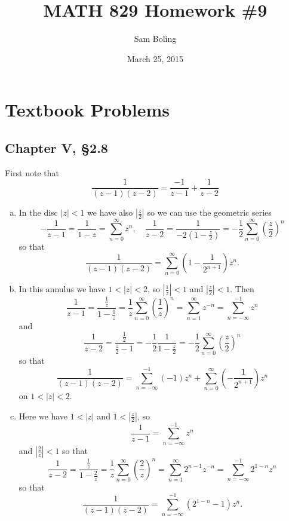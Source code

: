 \documentclass{article}
\title{MATH 829 Homework \#9}
\date{March 25, 2015}
\author{Sam Boling}
\newcounter{Problem}
\begin{document}
\begin{titlepage}
\maketitle
\end{titlepage}

\section{Textbook Problems}
\subsection{Chapter V, \S 2.8}
First note that
$$
  \frac{1}{(z - 1)(z-2)} 
= \frac{-1}{z - 1}
+ \frac{1}{z - 2}
$$
\begin{enumerate}[(a)]
  \item{
    In the disc $|z| < 1$ we have also $\left|\frac{z}{2}\right|$ so we can
    use the geometric series
    $$
      -\frac{1}{z - 1} 
    =  \frac{1}{1 - z} 
    =  \sum_{n=0}^\infty z^n, \quad
      \frac{1}{z - 2} 
    = \frac{1}{-2(1 - \frac{z}{2})} 
    = -\frac{1}{2}
       \sum_{n=0}^\infty 
         \left(\frac{z}{2}\right)^n
    $$
    so that
    $$
      \frac{1}{(z-1)(z-2)}
    = \sum_{n=0}^\infty 
        \left(
          1 - \frac{1}{2^{n+1}}
        \right)
        z^n.
    $$
  }
  \item{
    In this annulus we have $1 < |z| < 2$, so 
    $\left|\frac{1}{z}\right| < 1$ and 
    $\left|\frac{z}{2}\right| < 1$. Then
    $$
      \frac{1}{z - 1} 
    = \frac{\frac{1}{z}}
           {1 - \frac{1}{z}}
    = \frac{1}{z}
      \sum_{n=0}^\infty 
        \left(\frac{1}{z}\right)^n
    = \sum_{n=1}^\infty z^{-n}
    = \sum_{n=-\infty}^{-1} z^n
    $$
    and
    $$
      \frac{1}{z - 2}
    = \frac{\frac{1}{2}}
           {\frac{z}{2} - 1}
    = -\frac{1}{2}
       \frac{1}{1 - \frac{z}{2}}
    = -\frac{1}{2}
       \sum_{n=0}^\infty
         \left(\frac{z}{2}\right)^n
    $$
    so that
    $$
      \frac{1}{(z-1)(z-2)}
    = \sum_{n=-\infty}^{-1} (-1) z^n
    + \sum_{n=0}^\infty \left(-\frac{1}{2^{n+1}}\right) z^n
    $$
    on $1 < |z| < 2$.
  }
  \item{
    Here we have $1 < |z|$ and $1 < \left|\frac{z}{2}\right|$, so
    $$
      \frac{1}{z - 1} 
    = \sum_{n=-\infty}^{-1} 
        z^{n}
    $$
    and $\left|\frac{2}{z}\right| < 1$ so that
    $$
      \frac{1}{z - 2}
    = \frac{\frac{1}{z}}{1 - \frac{2}{z}}
    = \frac{1}{z}
      \sum_{n=0}^\infty
        \left(\frac{2}{z}\right)^n
    = \sum_{n=1}^\infty
        2^{n-1} z^{-n}
    = \sum_{n=-\infty}^{-1}
        2^{1-n} z^n
    $$
    so that
    $$
      \frac{1}{(z-1)(z-2)}
    = \sum_{n=-\infty}^{-1}
        (2^{1-n} - 1) z^n.
    $$
  }
\end{enumerate}
\end{document}
